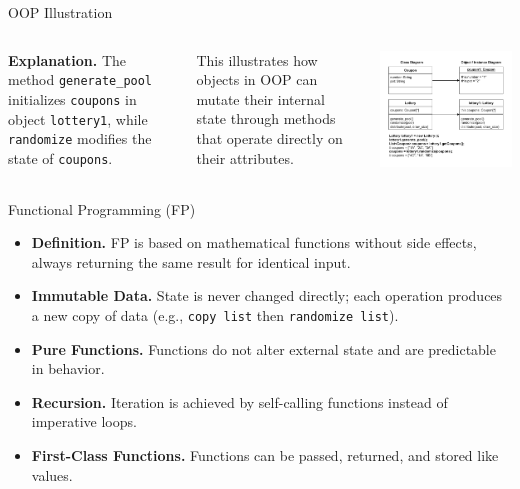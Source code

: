 \documentclass[aspectratio=169, table]{beamer}
\begin{document}
\begin{frame}{OOP Illustration}
	\vspace{10pt}
	\begin{columns}[]
		\textbf{Explanation.}  
		The method \texttt{generate\_pool} initializes \texttt{coupons} in object \texttt{lottery1},  
		while \texttt{randomize} modifies the state of \texttt{coupons}.  
		
		\vspace{10pt}
		This illustrates how objects in OOP can mutate their internal state  
		through methods that operate directly on their attributes.
		
		\centering
		\includegraphics[width=\textwidth]{../../assets/object-oriented.pdf}
	\end{columns}
\end{frame}

\begin{frame}{Functional Programming (FP)}
	\vspace{20pt}
	\begin{itemize}
		\item \textbf{Definition.} FP is based on mathematical functions without side effects, always returning the same result for identical input.  
		\item \textbf{Immutable Data.} State is never changed directly; each operation produces a new copy of data (e.g., \texttt{copy list} then \texttt{randomize list}).  
		\item \textbf{Pure Functions.} Functions do not alter external state and are predictable in behavior.  
		\item \textbf{Recursion.} Iteration is achieved by self-calling functions instead of imperative loops.  
		\item \textbf{First-Class Functions.} Functions can be passed, returned, and stored like values.  
	\end{itemize}
\end{frame}
\end{document}
